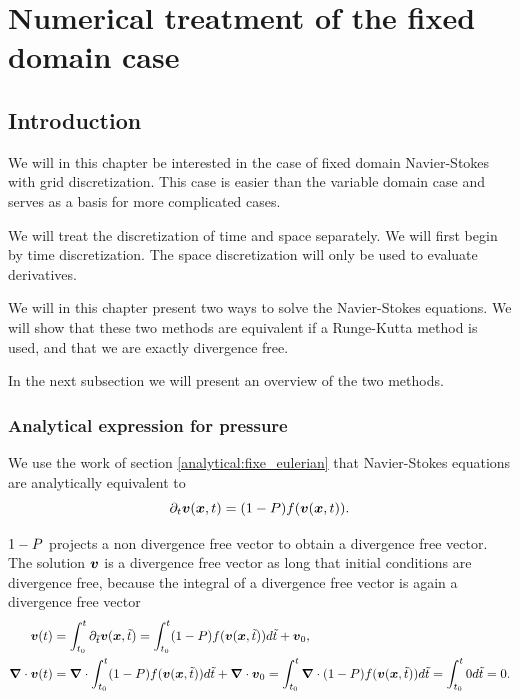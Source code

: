 \chapter{Numerical treatment of the fixed domain case}
\minitoc

\section{Introduction}

We will in this chapter be interested in the case of fixed domain Navier-Stokes with grid discretization.
This case is easier than the variable domain case and serves as a basis for more complicated cases.

We will treat the discretization of time and space separately.
We will first begin by time discretization.
The space discretization will only be used to evaluate derivatives.

We will in this chapter present two ways to solve the Navier-Stokes equations.
We will show that these two methods are equivalent if a Runge-Kutta method is used,
and that we are exactly divergence free.

In the next subsection we will present an overview of the two methods.

\subsection{Analytical expression for pressure}
\label{fixed:analytical}

We use the work of section \ref{analytical:fixe_eulerian} that Navier-Stokes equations are analytically equivalent to
\begin{equation}
  \partial_t {\boldsymbol {v}}({\boldsymbol {x}} ,t)=(1-P)f({\boldsymbol {v}}({\boldsymbol {x}},t)).
\end{equation}

$1-P$ projects a non divergence free vector to obtain a divergence free vector.
The solution ${\boldsymbol {v}}$ is a divergence free vector as long that initial conditions are divergence free, because the integral of a divergence free vector is again a divergence free vector
\begin{align*}
 {\boldsymbol {v}}(t)&=\int_{t_0}^{t}\partial_{\tilde{t}} {\boldsymbol {v}}({\boldsymbol {x}} ,\tilde{t})=\int_{t_0}^{t} (1-P)f({\boldsymbol {v}}({\boldsymbol {x}},\tilde{t})) d\tilde{t}+{\boldsymbol {v}}_{0},\\
 {\boldsymbol {\nabla}}\cdot {\boldsymbol {v}}(t)&= {\boldsymbol {\nabla}}\cdot\int_{t_0}^{t} (1-P)f({\boldsymbol {v}}({\boldsymbol {x}},\tilde{t})) d\tilde{t}+{\boldsymbol {\nabla}}\cdot {\boldsymbol {v}}_{0}=\int_{t_0}^{t} {\boldsymbol {\nabla}}\cdot(1-P)f({\boldsymbol {v}}({\boldsymbol {x}},\tilde{t})) d\tilde{t}=\int_{t_0}^{t} 0 d\tilde{t}=0.
\end{align*}


